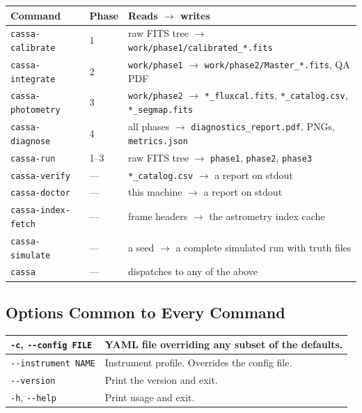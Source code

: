 \documentclass[11pt,a4paper]{article}
\begin{document}
\begin{center}
\begin{tabularx}{\textwidth}{|l|l|X|}
\hline
\textbf{Command} & \textbf{Phase} & \textbf{Reads $\rightarrow$ writes} \\
\hline
\texttt{cassa-calibrate} & 1 & raw FITS tree $\rightarrow$ \texttt{work/phase1/calibrated\_*.fits} \\
\hline
\texttt{cassa-integrate} & 2 & \texttt{work/phase1} $\rightarrow$ \texttt{work/phase2/Master\_*.fits}, QA PDF \\
\hline
\texttt{cassa-photometry} & 3 & \texttt{work/phase2} $\rightarrow$ \texttt{*\_fluxcal.fits}, \texttt{*\_catalog.csv}, \texttt{*\_segmap.fits} \\
\hline
\texttt{cassa-diagnose} & 4 & all phases $\rightarrow$ \texttt{diagnostics\_report.pdf}, PNGs, \texttt{metrics.json} \\
\hline
\texttt{cassa-run} & 1--3 & raw FITS tree $\rightarrow$ \texttt{phase1}, \texttt{phase2}, \texttt{phase3} \\
\hline
\texttt{cassa-verify} & --- & \texttt{*\_catalog.csv} $\rightarrow$ a report on stdout \\
\hline
\texttt{cassa-doctor} & --- & this machine $\rightarrow$ a report on stdout \\
\hline
\texttt{cassa-index-fetch} & --- & frame headers $\rightarrow$ the astrometry index cache \\
\hline
\texttt{cassa-simulate} & --- & a seed $\rightarrow$ a complete simulated run with truth files \\
\hline
\texttt{cassa} & --- & dispatches to any of the above \\
\hline
\end{tabularx}
\end{center}

\subsection{Options Common to Every Command}
\begin{center}
\begin{tabularx}{\textwidth}{|l|X|}
\hline
\texttt{-c}, \texttt{-{}-config FILE} & YAML file overriding any subset of the defaults. \\
\hline
\texttt{-{}-instrument NAME} & Instrument profile. Overrides the config file. \\
\hline
\texttt{-{}-version} & Print the version and exit. \\
\hline
\texttt{-h}, \texttt{-{}-help} & Print usage and exit. \\
\hline
\end{tabularx}
\end{center}
\end{document}
